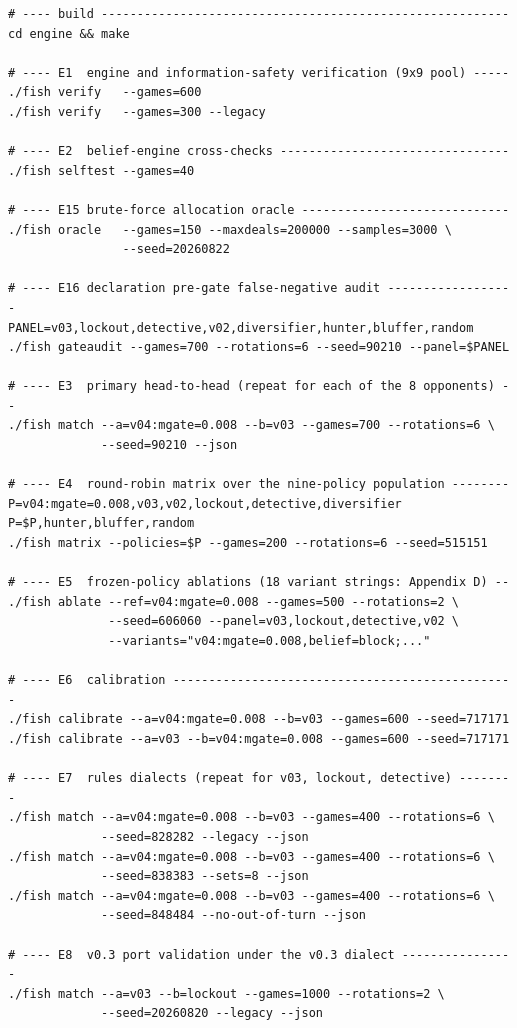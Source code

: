 \documentclass[11pt]{article}
\theoremstyle{definition}
\begin{document}
\begin{verbatim}
# ---- build ---------------------------------------------------------
cd engine && make

# ---- E1  engine and information-safety verification (9x9 pool) -----
./fish verify   --games=600
./fish verify   --games=300 --legacy

# ---- E2  belief-engine cross-checks --------------------------------
./fish selftest --games=40

# ---- E15 brute-force allocation oracle -----------------------------
./fish oracle   --games=150 --maxdeals=200000 --samples=3000 \
                --seed=20260822

# ---- E16 declaration pre-gate false-negative audit ------------------
PANEL=v03,lockout,detective,v02,diversifier,hunter,bluffer,random
./fish gateaudit --games=700 --rotations=6 --seed=90210 --panel=$PANEL

# ---- E3  primary head-to-head (repeat for each of the 8 opponents) --
./fish match --a=v04:mgate=0.008 --b=v03 --games=700 --rotations=6 \
             --seed=90210 --json

# ---- E4  round-robin matrix over the nine-policy population --------
P=v04:mgate=0.008,v03,v02,lockout,detective,diversifier
P=$P,hunter,bluffer,random
./fish matrix --policies=$P --games=200 --rotations=6 --seed=515151

# ---- E5  frozen-policy ablations (18 variant strings: Appendix D) --
./fish ablate --ref=v04:mgate=0.008 --games=500 --rotations=2 \
              --seed=606060 --panel=v03,lockout,detective,v02 \
              --variants="v04:mgate=0.008,belief=block;..."

# ---- E6  calibration ------------------------------------------------
./fish calibrate --a=v04:mgate=0.008 --b=v03 --games=600 --seed=717171
./fish calibrate --a=v03 --b=v04:mgate=0.008 --games=600 --seed=717171

# ---- E7  rules dialects (repeat for v03, lockout, detective) --------
./fish match --a=v04:mgate=0.008 --b=v03 --games=400 --rotations=6 \
             --seed=828282 --legacy --json
./fish match --a=v04:mgate=0.008 --b=v03 --games=400 --rotations=6 \
             --seed=838383 --sets=8 --json
./fish match --a=v04:mgate=0.008 --b=v03 --games=400 --rotations=6 \
             --seed=848484 --no-out-of-turn --json

# ---- E8  v0.3 port validation under the v0.3 dialect ----------------
./fish match --a=v03 --b=lockout --games=1000 --rotations=2 \
             --seed=20260820 --legacy --json


\end{verbatim}
\end{document}
